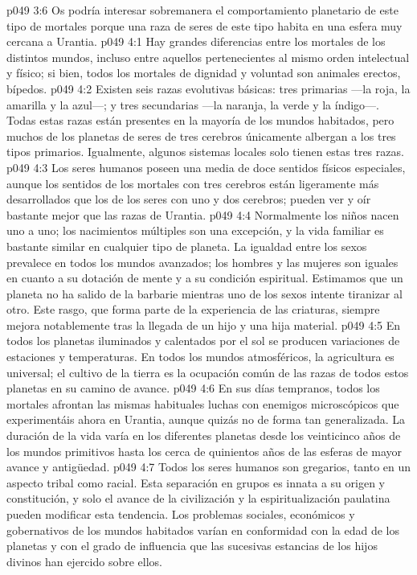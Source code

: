 \vs p049 3:6 Os podría interesar sobremanera el comportamiento planetario de este tipo de mortales porque una raza de seres de este tipo habita en una esfera muy cercana a Urantia.
\vs p049 4:1 Hay grandes diferencias entre los mortales de los distintos mundos, incluso entre aquellos pertenecientes al mismo orden intelectual y físico; si bien, todos los mortales de dignidad y voluntad son animales erectos, bípedos.
\vs p049 4:2 Existen seis razas evolutivas básicas: tres primarias ---la roja, la amarilla y la azul---; y tres secundarias ---la naranja, la verde y la índigo---. Todas estas razas están presentes en la mayoría de los mundos habitados, pero muchos de los planetas de seres de tres cerebros únicamente albergan a los tres tipos primarios. Igualmente, algunos sistemas locales solo tienen estas tres razas.
\vs p049 4:3 Los seres humanos poseen una media de doce sentidos físicos especiales, aunque los sentidos de los mortales con tres cerebros están ligeramente más desarrollados que los de los seres con uno y dos cerebros; pueden ver y oír bastante mejor que las razas de Urantia.
\vs p049 4:4 Normalmente los niños nacen uno a uno; los nacimientos múltiples son una excepción, y la vida familiar es bastante similar en cualquier tipo de planeta. La igualdad entre los sexos prevalece en todos los mundos avanzados; los hombres y las mujeres son iguales en cuanto a su dotación de mente y a su condición espiritual. Estimamos que un planeta no ha salido de la barbarie mientras uno de los sexos intente tiranizar al otro. Este rasgo, que forma parte de la experiencia de las criaturas, siempre mejora notablemente tras la llegada de un hijo y una hija material.
\vs p049 4:5 \pc En todos los planetas iluminados y calentados por el sol se producen variaciones de estaciones y temperaturas. En todos los mundos atmosféricos, la agricultura es universal; el cultivo de la tierra es la ocupación común de las razas de todos estos planetas en su camino de avance.
\vs p049 4:6 En sus días tempranos, todos los mortales afrontan las mismas habituales luchas con enemigos microscópicos que experimentáis ahora en Urantia, aunque quizás no de forma tan generalizada. La duración de la vida varía en los diferentes planetas desde los veinticinco años de los mundos primitivos hasta los cerca de quinientos años de las esferas de mayor avance y antigüedad.
\vs p049 4:7 Todos los seres humanos son gregarios, tanto en un aspecto tribal como racial. Esta separación en grupos es innata a su origen y constitución, y solo el avance de la civilización y la espiritualización paulatina pueden modificar esta tendencia. Los problemas sociales, económicos y gobernativos de los mundos habitados varían en conformidad con la edad de los planetas y con el grado de influencia que las sucesivas estancias de los hijos divinos han ejercido sobre ellos.
